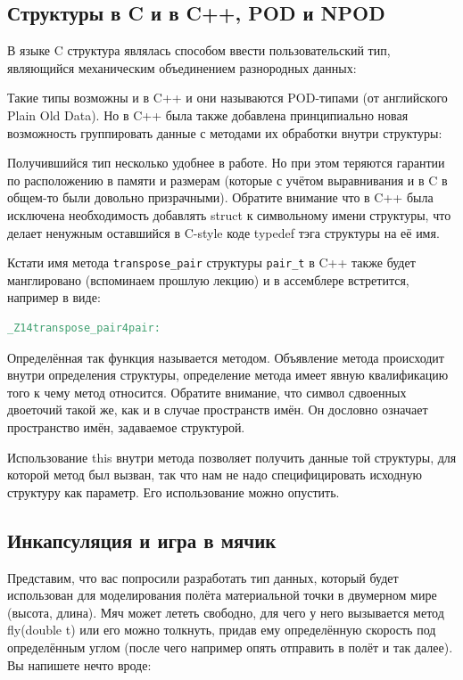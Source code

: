 \documentclass[a4paper,12pt,oneside]{article}
\begin{document}
\subsection{Структуры в C и в C++, POD и NPOD}

В языке C структура являлась способом ввести пользовательский тип, являющийся механическим объединением разнородных данных:



Такие типы возможны и в C++ и они называются POD-типами (от английского Plain Old Data). Но в C++ была также добавлена принципиально новая возможность группировать данные с методами их обработки внутри структуры:



Получившийся тип несколько удобнее в работе. Но при этом теряются гарантии по расположению в памяти и размерам (которые с учётом выравнивания и в C в общем-то были довольно призрачными). Обратите внимание что в C++ была исключена необходимость добавлять struct к символьному имени структуры, что делает ненужным оставшийся в C-style коде typedef тэга структуры на её имя.

Кстати имя метода \lstinline!transpose_pair! структуры \lstinline!pair_t! в C++ также будет манглировано (вспоминаем прошлую лекцию) и в ассемблере встретится, например в виде:

\begin{lstlisting}[language=make]
_Z14transpose_pair4pair:
\end{lstlisting}

Определённая так функция называется методом. Объявление метода происходит внутри определения структуры, определение метода имеет явную квалификацию того к чему метод относится. Обратите внимание, что символ сдвоенных двоеточий такой же, как и в случае пространств имён. Он дословно означает пространство имён, задаваемое структурой.

Использование this внутри метода позволяет получить данные той структуры, для которой метод был вызван, так что нам не надо специфицировать исходную структуру как параметр. Его использование можно опустить.

\subsection{Инкапсуляция и игра в мячик}

Представим, что вас попросили разработать тип данных, который будет использован для моделирования полёта материальной точки в двумерном мире (высота, длина). Мяч может лететь свободно, для чего у него вызывается метод fly(double t) или его можно толкнуть, придав ему определённую скорость под определённым углом (после чего например опять отправить в полёт и так далее). Вы напишете нечто вроде:
\end{document}
